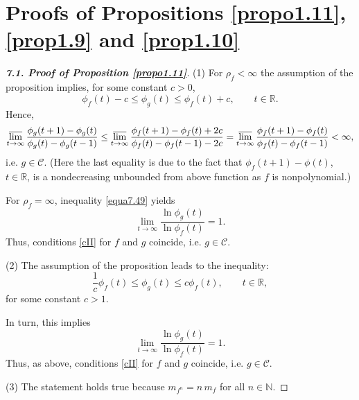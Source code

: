 \documentclass[11pt, oneside]{amsart}
\begin{document}
\section{Proofs of Propositions \ref{propo1.11}, \ref{prop1.9} and \ref{prop1.10}}
\begin{proof}[{\bf 7.1. Proof of Proposition \ref{propo1.11}}]
(1) For $\rho_f<\infty$ the assumption of the proposition implies,
for some constant $c>0$,
\begin{equation}\label{equa7.49}
\phi_f(t)-c\le\phi_g(t)\le\phi_f(t)+c,\qquad t\in\mathbb R.
\end{equation}
Hence,
\[
\varlimsup_{t\rightarrow\infty}\frac{\phi_g(t+1)-\phi_g(t)}{\phi_g(t)-\phi_g(t-1)}\le \varlimsup_{t\rightarrow\infty}\frac{\phi_f(t+1)-\phi_f(t)+2c}{\phi_f(t)-\phi_f(t-1)-2c}=\varlimsup_{t\rightarrow\infty}\frac{\phi_f(t+1)-\phi_f(t)}{\phi_f(t)-\phi_f(t-1)}<\infty,
\]
i.e. $g\in\mathscr C$. (Here the last equality is due to the fact that  $\phi_f(t+1)-\phi(t)$, $t\in\mathbb R$, is a nondecreasing unbounded from above function as $f$ is nonpolynomial.) 

For $\rho_f=\infty$, inequality \eqref{equa7.49} yields
\[
\lim_{t\rightarrow\infty}\frac{\ln\phi_g(t)}{\ln\phi_f(t)}=1.
\]
Thus, conditions \eqref{cII} for $f$  and $g$ coincide, i.e. $g\in\mathscr C$.\smallskip

\noindent (2) The assumption of the proposition leads to the inequality: 
\[
\frac 1c \phi_f(t)\le \phi_g(t)\le c\phi_f(t),\qquad t\in\mathbb R,
\]
for some constant $c>1$.

In turn, this implies
\[
\lim_{t\rightarrow\infty}\frac{\ln\phi_g(t)}{\ln\phi_f(t)}=1.
\]
Thus, as above, conditions \eqref{cII} for $f$ and $g$ coincide, i.e. $g\in\mathscr C$.\smallskip
 
\noindent (3) The statement holds true because $m_{f^n}=n\, m_f$ for all $n\in\mathbb N$.
\end{proof}
\end{document}
